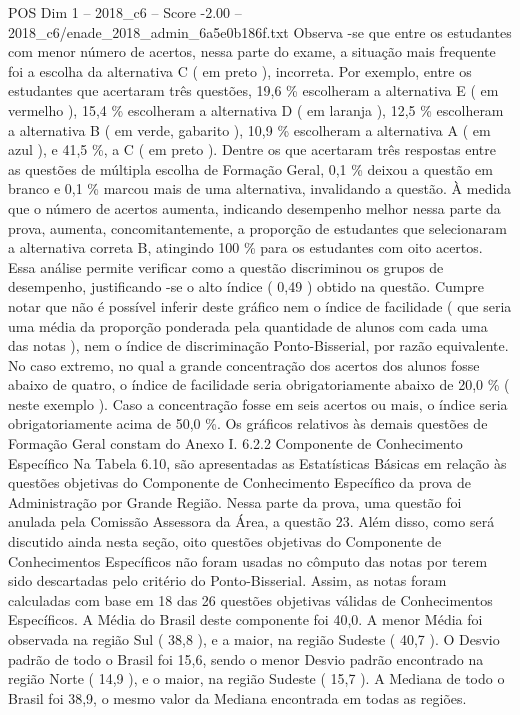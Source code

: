 \begin{textsample}{POS Dim 1 – 2018\_c6 – Score -2.00 – 2018\_c6/enade\_2018\_admin\_6a5e0b186f.txt}
Observa -se que entre os estudantes com menor número de acertos, nessa parte do exame, a situação mais frequente foi a escolha da alternativa C ( em preto ), incorreta.
Por exemplo, entre os estudantes que acertaram três questões, 19,6 \% escolheram a alternativa E ( em vermelho ), 15,4 \% escolheram a alternativa D ( em laranja ), 12,5 \% escolheram a alternativa B ( em verde, gabarito ), 10,9 \% escolheram a alternativa A ( em azul ), e 41,5 \%, a C ( em preto ).
Dentre os que acertaram três respostas entre as questões de múltipla escolha de Formação Geral, 0,1 \% deixou a questão em branco e 0,1 \% marcou mais de uma alternativa, invalidando a questão.
À medida que o número de acertos aumenta, indicando desempenho melhor nessa parte da prova, aumenta, concomitantemente, a proporção de estudantes que selecionaram a alternativa correta B, atingindo 100 \% para os estudantes com oito acertos.
Essa análise permite verificar como a questão discriminou os grupos de desempenho, justificando -se o alto índice ( 0,49 ) obtido na questão.
Cumpre notar que não é possível inferir deste gráfico nem o índice de facilidade ( que seria uma média da proporção ponderada pela quantidade de alunos com cada uma das notas ), nem o índice de discriminação Ponto-Bisserial, por razão equivalente.
No caso extremo, no qual a grande concentração dos acertos dos alunos fosse abaixo de quatro, o índice de facilidade seria obrigatoriamente abaixo de 20,0 \% ( neste exemplo ).
Caso a concentração fosse em seis acertos ou mais, o índice seria obrigatoriamente acima de 50,0 \%.
Os gráficos relativos às demais questões de Formação Geral constam do Anexo I. 6.2.2 Componente de Conhecimento Específico Na Tabela 6.10, são apresentadas as Estatísticas Básicas em relação às questões objetivas do Componente de Conhecimento Específico da prova de Administração por Grande Região.
Nessa parte da prova, uma questão foi anulada pela Comissão Assessora da Área, a questão 23.
Além disso, como será discutido ainda nesta seção, oito questões objetivas do Componente de Conhecimentos Específicos não foram usadas no cômputo das notas por terem sido descartadas pelo critério do Ponto-Bisserial.
Assim, as notas foram calculadas com base em 18 das 26 questões objetivas válidas de Conhecimentos Específicos.
A Média do Brasil deste componente foi 40,0.
A menor Média foi observada na região Sul ( 38,8 ), e a maior, na região Sudeste ( 40,7 ).
O Desvio padrão de todo o Brasil foi 15,6, sendo o menor Desvio padrão encontrado na região Norte ( 14,9 ), e o maior, na região Sudeste ( 15,7 ).
A Mediana de todo o Brasil foi 38,9, o mesmo valor da Mediana encontrada em todas as regiões.

\end{textsample}
